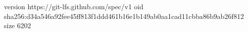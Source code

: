 version https://git-lfs.github.com/spec/v1
oid sha256:d34a546a92fee45ff813f1ddd461b16e1b149ab0aa1cad11cbba86b9ab26f812
size 6202
